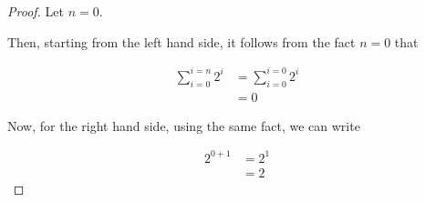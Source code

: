 \documentclass[12pt]{article}
\begin{document}
\begin{enumerate}[a.]
\begin{proof}
        \bigskip

        Let $n = 0$.

        \bigskip

        Then, starting from the left hand side, it follows from the fact $n = 0$ that

        \setcounter{equation}{0}
        \begin{align}
            \sum\limits_{i=0}^{i=n} 2^i &= \sum\limits_{i=0}^{i=0} 2^i\\
            &= 0
        \end{align}


        Now, for the right hand side, using the same fact, we can write

        \begin{align}
            2^{0+1} &= 2^1\\
            &= 2
        \end{align}
    \end{proof}

\end{enumerate}

\bigskip
\end{document}
